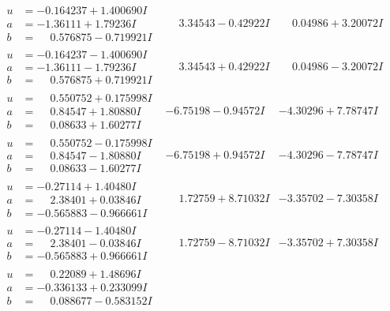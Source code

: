 \documentclass[1p]{elsarticle_modified}
\theoremstyle{definition}
\begin{document}
$$\begin{array}{c|c|c}
\begin{aligned}
u &= -0.164237 + 1.400690 I \\
a &= -1.36111 + 1.79236 I \\
b &= \phantom{-}0.576875 - 0.719921 I\end{aligned}
 & \phantom{-}3.34543 - 0.42922 I & \phantom{-}0.04986 + 3.20072 I \\ \hline\begin{aligned}
u &= -0.164237 - 1.400690 I \\
a &= -1.36111 - 1.79236 I \\
b &= \phantom{-}0.576875 + 0.719921 I\end{aligned}
 & \phantom{-}3.34543 + 0.42922 I & \phantom{-}0.04986 - 3.20072 I \\ \hline\begin{aligned}
u &= \phantom{-}0.550752 + 0.175998 I \\
a &= \phantom{-}0.84547 + 1.80880 I \\
b &= \phantom{-}0.08633 + 1.60277 I\end{aligned}
 & -6.75198 - 0.94572 I & -4.30296 + 7.78747 I \\ \hline\begin{aligned}
u &= \phantom{-}0.550752 - 0.175998 I \\
a &= \phantom{-}0.84547 - 1.80880 I \\
b &= \phantom{-}0.08633 - 1.60277 I\end{aligned}
 & -6.75198 + 0.94572 I & -4.30296 - 7.78747 I \\ \hline\begin{aligned}
u &= -0.27114 + 1.40480 I \\
a &= \phantom{-}2.38401 + 0.03846 I \\
b &= -0.565883 - 0.966661 I\end{aligned}
 & \phantom{-}1.72759 + 8.71032 I & -3.35702 - 7.30358 I \\ \hline\begin{aligned}
u &= -0.27114 - 1.40480 I \\
a &= \phantom{-}2.38401 - 0.03846 I \\
b &= -0.565883 + 0.966661 I\end{aligned}
 & \phantom{-}1.72759 - 8.71032 I & -3.35702 + 7.30358 I \\ \hline\begin{aligned}
u &= \phantom{-}0.22089 + 1.48696 I \\
a &= -0.336133 + 0.233099 I \\
b &= \phantom{-}0.088677 - 0.583152 I\end{aligned}

\end{array}$$
\end{document}
